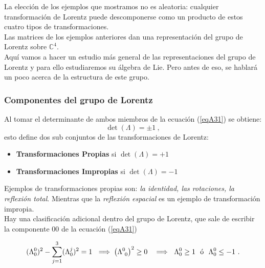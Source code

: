 La elección de los ejemplos que mostramos no es aleatoria: cualquier transformación de Lorentz puede descomponerse como un producto de estos cuatro tipos de transformaciones.\\

Las matrices de los ejemplos anteriores dan una representación del grupo de Lorentz sobre $\mathbb{C}^{4}$.\\
Aquí vamos a hacer un estudio más general de las representaciones del grupo de Lorentz y para ello estudiaremos su álgebra de Lie. Pero antes de eso, se hablará un poco acerca de la estructura de este grupo.

\subsubsection{Componentes del grupo de Lorentz}

Al tomar el determinante de ambos miembros de la ecuación (\ref{eqA31}) se obtiene:
\begin{equation}
    \det (\Lambda) = \pm 1~,
\end{equation}
esto define dos sub conjuntos de las transformaciones de Lorentz:
\begin{itemize}
    \item \textbf{Transformaciones Propias} si $\det (\Lambda) = +1$
    \item \textbf{Transformaciones Impropias} si $\det (\Lambda) = -1$
\end{itemize}

Ejemplos de transformaciones propias son: \emph{la identidad, las rotaciones, la reflexión total}. Mientras que la \emph{reflexión espacial} es un ejemplo de transformación impropia.\\

Hay una clasificación adicional dentro del grupo de Lorentz, que sale de escribir la componente $00$ de la ecuación (\ref{eqA31})

\begin{equation}
    (\Lambda^{0}_{0})^{2}-\sum_{j=1}^{3}(\Lambda^{j}_{0})^{2}=1~ \implies \qty(\Lambda^{0}_{~0})^{2} \geq 0 ~~\implies~\Lambda^{0}_{0} \geq 1 ~~ \text{ó} ~~ \Lambda^{0}_{0}  \leq -1~.
\end{equation}

